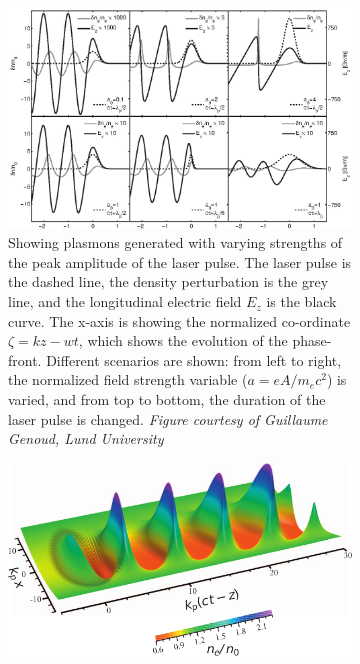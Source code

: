 \documentclass[12pt,letter]{article}
\begin{document}
\begin{figure}[h!]
        \begin{singlespace*}
        \centering
        \begin{subfigure}[t]{\textwidth}
            \includegraphics[height = .4\textheight]{../figures/densityandewave.eps}
            \caption{\small  Showing plasmons generated with varying strengths of the peak
                amplitude of the laser pulse.\cite{genothesis}\label{fig:plasmon}
                The laser pulse is the dashed line, the density perturbation is the grey
                line, and the longitudinal electric field $E_z$ is the black
                curve. The x-axis is showing the normalized co-ordinate $\zeta =
                kz - wt$, which shows the evolution of the phase-front. Different
                scenarios are shown: from left to right, the normalized field strength variable
                ($a = eA/m_e c^2$) is varied, and from top to bottom, the duration of
                the laser pulse is changed. \em Figure courtesy of Guillaume Genoud, Lund
            University}
        \end{subfigure}

        \begin{subfigure}[t]{\textwidth}
            \includegraphics[height = .3\textheight]{../figures/esarey3dnonlin.pdf}


\end{subfigure}
\end{singlespace*}
\end{figure}
\end{document}
